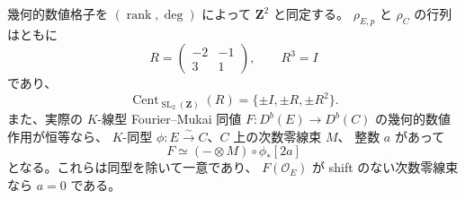 \begin{lemma}
\label{lem:nfm-elliptic-numerical-graph}
幾何的数値格子を $(\operatorname{rank},\deg)$ によって $\mathbf Z^2$ と同定する。
$\rho_{E,p}$ と $\rho_C$ の行列はともに
\[
 R=\begin{pmatrix}-2&-1\\3&1\end{pmatrix},\qquad R^3=I
\]
であり、
\begin{equation}\label{eq:nfm-elliptic-numerical-centralizer}
 \operatorname{Cent}_{\operatorname{SL}_2(\mathbf Z)}(R)
   =\{\pm I,\pm R,\pm R^2\}.
\end{equation}
また、実際の $K$-線型 Fourier--Mukai 同値
$F:D^b(E)\to D^b(C)$ の幾何的数値作用が恒等なら、
$K$-同型 $\phi:E\xrightarrow{\sim}C$、$C$ 上の次数零線束 $M$、
整数 $a$ があって
\begin{equation}\label{eq:nfm-elliptic-numerical-graph}
 F\simeq(-\otimes M)\circ\phi_*[2a]
\end{equation}
となる。これらは同型を除いて一意であり、
$F(\mathcal O_E)$ が shift のない次数零線束なら $a=0$ である。
\end{lemma}

